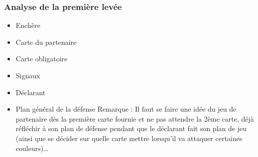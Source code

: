 \documentclass[a4paper]{article}
\begin{document}
\subsubsection{Analyse de la première levée}

\begin{itemize}
\item Enchère

\item Carte du partenaire

\item Carte obligatoire

\item Signaux

\item Déclarant

\item Plan général de la défense
Remarque : Il faut se faire une idée du jeu de partenaire dès la première carte fournie et ne pas attendre la 2ème carte, déjà réfléchir à son plan de défense pendant que le déclarant fait son plan de jeu (ainsi que se décider sur quelle carte mettre lorsqu’il va attaquer certaines couleurs)…


\end{itemize}
\end{document}
